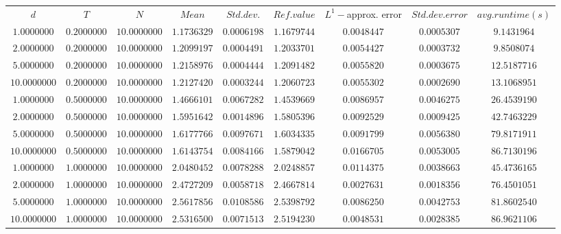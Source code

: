 \begin{tabular}{ccccccccc}
$d$ & $T$ & $N$ & $Mean$ & $Std. dev.$ & $Ref. value$ & $L^1-$approx. error & $Std. dev. error$ & $avg. runtime (s)$\\
$1.0000000$ & $0.2000000$ & $10.0000000$ & $1.1736329$ & $0.0006198$ & $1.1679744$ & $0.0048447$ & $0.0005307$ & $9.1431964$\\
$2.0000000$ & $0.2000000$ & $10.0000000$ & $1.2099197$ & $0.0004491$ & $1.2033701$ & $0.0054427$ & $0.0003732$ & $9.8508074$\\
$5.0000000$ & $0.2000000$ & $10.0000000$ & $1.2158976$ & $0.0004444$ & $1.2091482$ & $0.0055820$ & $0.0003675$ & $12.5187716$\\
$10.0000000$ & $0.2000000$ & $10.0000000$ & $1.2127420$ & $0.0003244$ & $1.2060723$ & $0.0055302$ & $0.0002690$ & $13.1068951$\\
$1.0000000$ & $0.5000000$ & $10.0000000$ & $1.4666101$ & $0.0067282$ & $1.4539669$ & $0.0086957$ & $0.0046275$ & $26.4539190$\\
$2.0000000$ & $0.5000000$ & $10.0000000$ & $1.5951642$ & $0.0014896$ & $1.5805396$ & $0.0092529$ & $0.0009425$ & $42.7463229$\\
$5.0000000$ & $0.5000000$ & $10.0000000$ & $1.6177766$ & $0.0097671$ & $1.6034335$ & $0.0091799$ & $0.0056380$ & $79.8171911$\\
$10.0000000$ & $0.5000000$ & $10.0000000$ & $1.6143754$ & $0.0084166$ & $1.5879042$ & $0.0166705$ & $0.0053005$ & $86.7130196$\\
$1.0000000$ & $1.0000000$ & $10.0000000$ & $2.0480452$ & $0.0078288$ & $2.0248857$ & $0.0114375$ & $0.0038663$ & $45.4736165$\\
$2.0000000$ & $1.0000000$ & $10.0000000$ & $2.4727209$ & $0.0058718$ & $2.4667814$ & $0.0027631$ & $0.0018356$ & $76.4501051$\\
$5.0000000$ & $1.0000000$ & $10.0000000$ & $2.5617856$ & $0.0108586$ & $2.5398792$ & $0.0086250$ & $0.0042753$ & $81.8602540$\\
$10.0000000$ & $1.0000000$ & $10.0000000$ & $2.5316500$ & $0.0071513$ & $2.5194230$ & $0.0048531$ & $0.0028385$ & $86.9621106$\\
\end{tabular}

